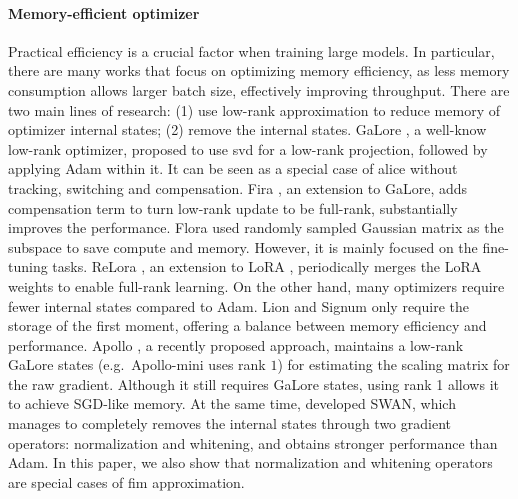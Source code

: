 \paragraph{Memory-efficient optimizer}
Practical efficiency is a crucial factor when training large models. In particular, there are many works that focus on optimizing memory efficiency, as less memory consumption allows larger batch size, effectively improving throughput.
There are two main lines of research: (1) use low-rank approximation to reduce memory of optimizer internal states; (2) remove the internal states.
GaLore \citep{zhao2024galore}, a well-know low-rank optimizer, proposed to use \gls{svd} for a low-rank projection, followed by applying Adam within it. It can be seen as a special case of \gls{alice} without tracking, switching and compensation.
Fira \citep{chen2024fira}, an extension to GaLore, adds compensation term to turn low-rank update to be full-rank, substantially improves the performance. Flora \citep{si2024flora} used randomly sampled Gaussian matrix as the subspace to save compute and memory. However, it is mainly focused on the fine-tuning tasks. ReLora \citep{lialin2023relora}, an extension to LoRA \citep{hu2021lora}, periodically merges the LoRA weights to enable full-rank learning. 
On the other hand, many optimizers require fewer internal states compared to Adam. Lion \citep{chen2024symbolic} and Signum \citep{bernstein2018signsgd} only require the storage of the first moment, offering a balance between memory efficiency and performance. Apollo \citep{zhu2024apollo}, a recently proposed approach, maintains a low-rank GaLore states (e.g.~Apollo-mini uses rank $1$) for estimating the scaling matrix for the raw gradient. Although it still requires GaLore states, using rank 1 allows it to achieve SGD-like memory. At the same time, \citet{ma2024swan} developed SWAN, which manages to completely removes the internal states through two gradient operators: normalization and whitening, and obtains stronger performance than Adam. In this paper, we also show that normalization and whitening operators are special cases of \gls{fim} approximation.